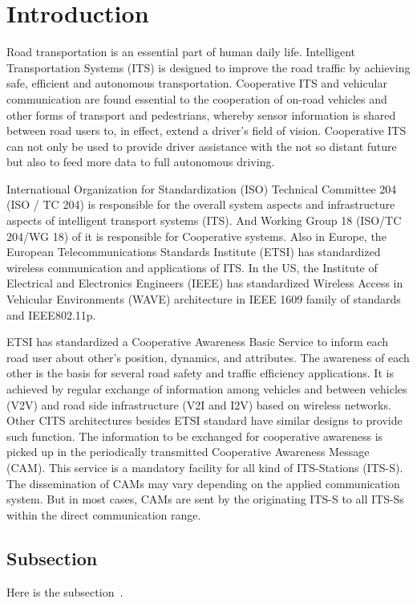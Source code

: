 \section{Introduction}

Road transportation is an essential part of human daily life.
Intelligent Transportation Systems (ITS) is designed to improve the road traffic by achieving safe,
efficient and autonomous transportation.
Cooperative ITS and vehicular communication are found essential to the
cooperation of on-road vehicles and other forms of transport and pedestrians,
whereby sensor information is shared between road users to,
in effect, extend a driver’s field of vision.
Cooperative ITS can not only be used to provide driver assistance with the not so distant future
but also to feed more data to full autonomous driving.

International Organization for Standardization (ISO) Technical Committee 204 (ISO / TC 204)
is responsible for the overall system aspects and infrastructure aspects of intelligent transport systems (ITS).
And Working Group 18 (ISO/TC 204/WG 18) of it is responsible for Cooperative systems.
Also in Europe, the European Telecommunications Standards Institute (ETSI) has standardized wireless communication and applications of ITS.
In the US, the Institute of Electrical and Electronics Engineers (IEEE) has standardized Wireless Access
in Vehicular Environments (WAVE) architecture in IEEE 1609 family of standards and IEEE802.11p.

ETSI has standardized a Cooperative Awareness Basic Service to inform each road user about other's position, dynamics, and attributes.
The awareness of each other is the basis for several road safety and traffic efficiency applications.
It is achieved by regular exchange of information among vehicles and between vehicles (V2V)
and road side infrastructure (V2I and I2V) based on wireless networks.
Other CITS architectures besides ETSI standard have similar designs to provide such function.
The information to be exchanged for cooperative awareness is picked up in the periodically transmitted Cooperative Awareness Message (CAM).
This service is a mandatory facility for all kind of ITS-Stations (ITS-S).
The dissemination of CAMs may vary depending on the applied communication system.
But in most cases, CAMs are sent by the originating ITS-S to all ITS-Ss within the direct communication range.

\subsection{Subsection}

Here is the subsection~\cite{kitazato2016proxy}.